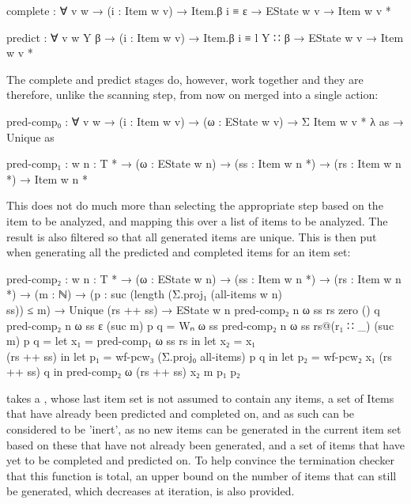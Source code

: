 		\begin{code}
			complete : ∀ {v w} → (i : Item w v) → Item.β i ≡ ε →
			  EState w v → Item w v *

			predict : ∀ {v w Y β} → (i : Item w v) → Item.β i ≡ l Y ∷ β →
			  EState w v → Item w v *
		\end{code}

 		The complete and predict stages do, however, work together and they are
 		therefore, unlike the scanning step, from now on merged into a single
 		action:

		\begin{code}
			pred-comp₀ : ∀ {v w} →
			  (i : Item w v) →
			  (ω : EState w v) →
			  Σ {Item w v *} λ as → Unique as

			pred-comp₁ : {w n : T *} → (ω : EState w n) →
			  (ss : Item w n *) → (rs : Item w n *) → Item w n *
		\end{code}

		This does not do much more than selecting the appropriate step based on
		the item to be analyzed, and mapping this over a list of items to be
		analyzed. The result is also filtered so that all generated items are
		unique. This is then put when generating all the predicted and
		completed items for an item set:

		\begin{code}
			pred-comp₂ : {w n : T *} →
			  (ω : EState w n) →
			  (ss : Item w n *) →
			  (rs : Item w n *) →
			  (m : ℕ) →
			  (p : suc (length (Σ.proj₁ (all-items {w} {n}) \\ ss)) ≤ m) →
			  Unique (rs ++ ss) →
			  EState w n
			pred-comp₂ {n} ω ss rs zero () q
			pred-comp₂ {n} ω ss ε (suc m) p q = Wₙ ω ss
			pred-comp₂ {n} ω ss rs@(r₁ ∷ _) (suc m) p q =
			  let x₁ = pred-comp₁ ω ss rs in
			  let x₂ = x₁ \\ (rs ++ ss) in
			  let p₁ = wf-pcw₃ (Σ.proj₀ all-items) p q in
			  let p₂ = wf-pcw₂ x₁ (rs ++ ss) q in
			  pred-comp₂ ω (rs ++ ss) x₂ m p₁ p₂
		\end{code}

		 takes a , whose last item set is not
		assumed to contain any items, a set of Items that have already been
		predicted and completed on, and as such can be considered to be
		'inert', as no new items can be generated in the current item set based
		on these that have not already been generated, and a set of items that
		have yet to be completed and predicted on. To help convince the
		termination checker that this function is total, an upper bound on the
		number of items that can still be generated, which decreases at
		iteration, is also provided.


